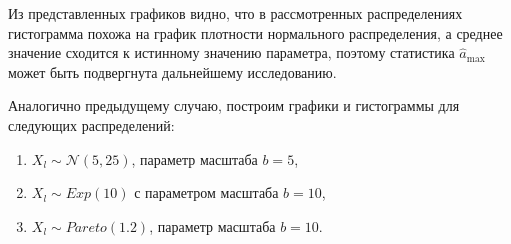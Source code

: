 \documentclass[14pt, a4paper, russian]{report}
\begin{document}



Из представленных графиков видно, что в рассмотренных распределениях гистограмма похожа на график плотности нормального распределения, а среднее значение сходится к истинному значению параметра, поэтому статистика $\hat{a}_{\max}$ может быть подвергнута дальнейшему исследованию.



Аналогично предыдущему случаю, построим графики и гистограммы для следующих распределений:

\begin{enumerate}
  \item $X_l \sim \mathcal{N}(5, 25)$, параметр масштаба $b = 5$,
  \item $X_l \sim Exp(10)$ с параметром масштаба $b = 10$,
  \item $X_l \sim Pareto(1.2)$, параметр масштаба $b = 10$.
\end{enumerate}



\end{document}
